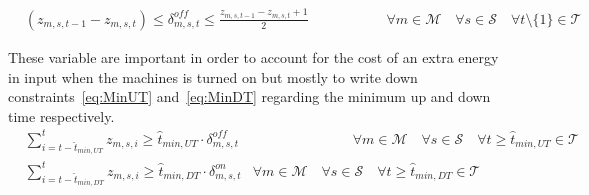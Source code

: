 \documentclass{article}
\newcommand{\cT}{{\mathcal T}}
\newcommand{\cM}{{\mathcal M}}
\newcommand{\cS}{{\mathcal S}}
\begin{document}
{\begin{align}
		& (z_{m,s,t-1}-z_{m,s,t}) \leq \delta_{m,s,t}^{off} \leq \frac{z_{m,s,t-1}-z_{m,s,t} +1}{2} & \hspace{2cm} \forall m \in \cM \quad \forall s \in \cS \quad \forall t \setminus\{1\} \in \cT \label{eq:DeltaOff}
		\end{align}		 	
\begin{comment}		
		\begin{align}
		& \Delta_{m,s,t}^{on} \geq (z_{m,s,t} - z_{m,s,t-1}) & \hspace{5cm} \forall m \in \cM \quad \forall s \in \cS \quad \forall t \setminus\{1\} \in \cT \label{eq:DeltaOn_1}\\
		& \Delta_{m,s,t}^{on} \leq (1 - z_{m,s,t-1}) & \hspace{5cm} \forall m \in \cM \quad \forall s \in \cS \quad \forall t \setminus\{1\} \in \cT \label{eq:DeltaOn_2}\\
		& \Delta_{m,s,t}^{on} \leq z_{m,s,t} & \hspace{5cm} \forall m \in \cM \quad \forall s \in \cS \quad \forall t \in \cT \label{eq:DeltaOn_3}\\
		& \Delta_{m,s,t}^{off} \geq (z_{m,s,t-1} - z_{m,s,t}) & \hspace{5cm} \forall m \in \cM \quad \forall s \in \cS \quad \forall t \setminus\{1\} \in \cT \label{eq:DeltaOff_1}\\
		& \Delta_{m,s,t}^{off} \leq (1 - z_{m,s,t}) & \hspace{5cm} \forall m \in \cM \quad \forall s \in \cS \quad \forall t \in \cT \label{eq:DeltaOff_2}\\
		& \Delta_{m,s,t}^{off} \leq z_{m,s,t-1} & \hspace{5cm} \forall m \in \cM \quad \forall s \in \cS \quad \forall t \setminus\{1\} \in \cT \label{eq:DeltaOff_3}
		\end{align}
\end{comment}
These variable are important in order to account for the cost of an extra energy in input when the machines is turned on but mostly to write down constraints~\eqref{eq:MinUT} and~\eqref{eq:MinDT} regarding the minimum up and down time respectively.	
		\begin{align}
		& \sum_{ i = t - \hat{t}_{min, UT} }^{t} z_{m,s,i} \geq \hat{t}_{min,UT} \cdot \delta_{m,s,t}^{off} & \hspace{3cm} \forall m \in \cM \quad \forall s \in \cS \quad \forall t \geq \hat{t}_{min, UT} \in \cT \label{eq:MinUT}\\
		& \sum_{ i = t - \hat{t}_{min, DT} }^{t} z_{m,s,i} \geq \hat{t}_{min,DT} \cdot \delta_{m,s,t}^{on} & \forall m \in \cM \quad \forall s \in \cS \quad \forall t \geq \hat{t}_{min, DT} \in \cT \label{eq:MinDT}

\end{align}}
\end{document}
